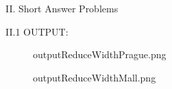 \documentclass[a4paper,12pt]{article}
\begin{document}
\begin{section}{II. Short Answer Problems}
\begin{subsection}{II.1}
OUTPUT:\\
\begin{figure}[!htb]
        \caption{outputReduceWidthPrague.png}
      \end{figure}
      
      
\begin{figure}[!htb]
        \caption{outputReduceWidthMall.png}
\end{figure}


\end{subsection}
\end{section}
\end{document}
